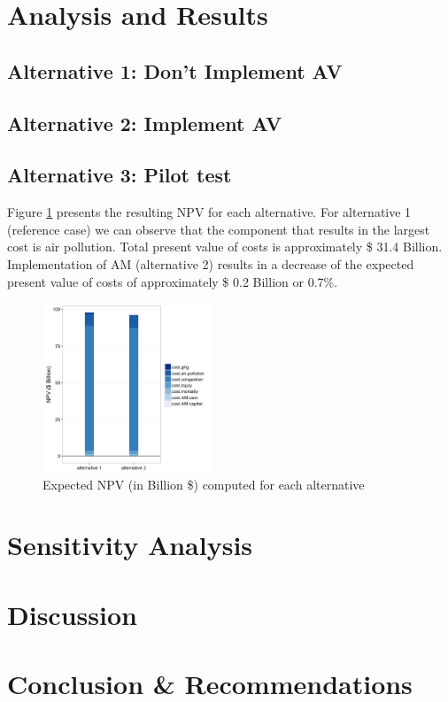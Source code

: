 \documentclass[11pt, letterpaper]{article}
\begin{document}
\section{Analysis and Results} \label{results}


\subsection{Alternative 1: Don't Implement AV}

\subsection{Alternative 2: Implement AV}

\subsection{Alternative 3: Pilot test}

Figure \ref{fig:alt1} presents the resulting NPV for each alternative. For alternative 1 (reference case) we can observe that the component that results in the largest cost is air pollution. Total present value of costs is approximately \$ 31.4 Billion. Implementation of AM (alternative 2) results in a decrease of the expected present value of costs of approximately \$ 0.2 Billion or 0.7\%.

\begin{figure}[H]
\begin{center}
\includegraphics[width=0.45\textwidth]{../../R/barplot1}
\caption{Expected NPV (in Billion \$) computed for each alternative}
\label{fig:alt1}
\end{center}
\end{figure}

\section{Sensitivity Analysis} \label{sensitivity}


\section{Discussion} \label{discussion}


\section{Conclusion \& Recommendations} \label{conclusion}

\end{document}
